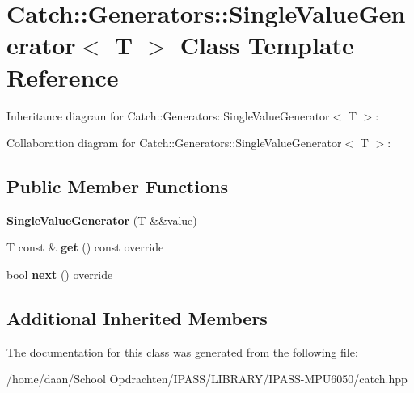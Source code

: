 \hypertarget{classCatch_1_1Generators_1_1SingleValueGenerator}{}\section{Catch\+:\+:Generators\+:\+:Single\+Value\+Generator$<$ T $>$ Class Template Reference}
\label{classCatch_1_1Generators_1_1SingleValueGenerator}


Inheritance diagram for Catch\+:\+:Generators\+:\+:Single\+Value\+Generator$<$ T $>$\+:


Collaboration diagram for Catch\+:\+:Generators\+:\+:Single\+Value\+Generator$<$ T $>$\+:
\subsection*{Public Member Functions}
\begin{DoxyCompactItemize}
\item 
\mbox{\label{classCatch_1_1Generators_1_1SingleValueGenerator_a532140dd2d1a673692271bb76a661ebe}} 
{\bfseries Single\+Value\+Generator} (T \&\&value)
\item 
\mbox{\label{classCatch_1_1Generators_1_1SingleValueGenerator_a5142058c52131a2471e7307972f99b50}} 
T const  \& {\bfseries get} () const override
\item 
\mbox{\label{classCatch_1_1Generators_1_1SingleValueGenerator_a10833b34e3ccbc484624185712eb8b6e}} 
bool {\bfseries next} () override
\end{DoxyCompactItemize}
\subsection*{Additional Inherited Members}


The documentation for this class was generated from the following file\+:\begin{DoxyCompactItemize}
\item 
/home/daan/\+School Opdrachten/\+I\+P\+A\+S\+S/\+L\+I\+B\+R\+A\+R\+Y/\+I\+P\+A\+S\+S-\/\+M\+P\+U6050/catch.\+hpp\end{DoxyCompactItemize}
